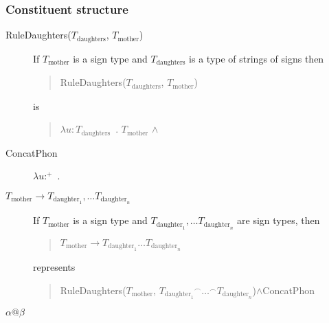 \subsubsection{Constituent structure} 
\begin{description}
\item[\textnormal{RuleDaughters($T_{\text{daughters}}$,
$T_{\text{mother}}$)}] \mbox{}

If $T_{\text{mother}}$ is a sign type and $T_{\text{daughters}}$ is a
type of strings of signs then
\begin{quote}
RuleDaughters($T_{\text{daughters}}$,
$T_{\text{mother}}$)
\end{quote}
is
\begin{quote}
  $\lambda u\! :\! T_{\text{daughters}}$\ . $T_{\text{mother}}$ \d{$\wedge$} 
\end{quote}

\item[\textnormal{ConcatPhon}] \mbox{}

  $\lambda
u$:$^+$\
. \\
\hspace*{1em}

\item[\textnormal{$T_{\text{mother}}\longrightarrow T_{\text{daughter}_1},\ldots
    T_{\text{daughter}_n}$}] \mbox{}

  If $T_{\text{mother}}$ is a sign type and
  $T_{\text{daughter}_1},\ldots T_{\text{daughter}_n}$ are sign types,
  then
  \begin{quote}
    $T_{\text{mother}}\longrightarrow T_{\text{daughter}_1}\ldots
    T_{\text{daughter}_n}$
  \end{quote}
  represents
  \begin{quote}
RuleDaughters($T_{\text{mother}}$,
${T_{\text{daughter}_1}}^\frown\ldots^\frown T_{\text{daughter}_n}$)\d{\d{$\wedge$}}ConcatPhon 
\end{quote}

\item[\textnormal{$\alpha\text{@}\beta$}] \mbox{}


\end{description}
